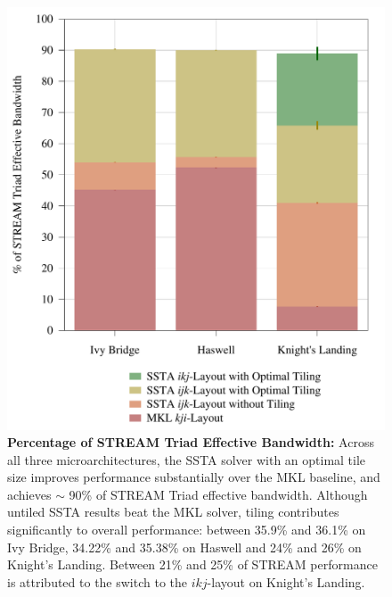 \documentclass{sig-alternate-05-2015}
\begin{document}
\begin{figure}[!h]
\end{figure}

\begin{figure}[!h]
    \centering
    \caption{
      \textbf{Percentage of STREAM Triad Effective Bandwidth:}
      Across all three microarchitectures, the SSTA solver with an optimal tile
        size improves performance substantially over the MKL baseline, and
        achieves \(\sim\) 90\% of STREAM Triad effective bandwidth.
      Although untiled SSTA results beat the MKL solver, tiling contributes
        significantly to overall performance: between 35.9\% and 36.1\% on 
        Ivy Bridge, 34.22\% and 35.38\% on Haswell and 24\% and 26\% on 
        Knight's Landing.
      Between 21\% and 25\% of STREAM performance is attributed to the switch to
        the \(ikj\)-layout on Knight's Landing. 
    }
    \label{fig:results:efficiency}
    \includegraphics[width=0.95\columnwidth]{figures/post_tsb_impact_of_optimizations_histogram_09_03_2016_09_04_2016_1socket.pdf}
\end{figure}
\end{document}

